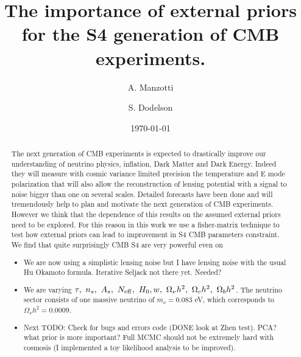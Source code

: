 \documentclass[aps,prl,preprint,groupedaddress]{revtex4-1}
\begin{document}
\graphicspath{{images/}}


\title{The importance of external priors for the S4 generation of CMB experiments.}

\author{A. Manzotti}
\author{S. Dodelson}


\date{\today}

\begin{abstract}
The next generation of CMB experiments is expected to drastically improve our understanding of neutrino physics, inflation, Dark Matter and Dark Energy.
Indeed they will measure with cosmic variance limited precision the temperature and E mode polarization that will also allow the reconstruction of lensing potential with a signal to noise bigger than one on several scales. Detailed forecasts have been done and will tremendously help to plan and motivate the next generation of CMB experiments. However we think that the dependence of this results on the assumed external priors need to be explored. For this reason in this work we use a fisher-matrix technique to test how external priors can lead to improvement in S4 CMB parameters constraint. We find that quite surprisingly CMB S4 are very powerful even on

\begin{itemize}
\item We are now using a simplistic lensing noise but I have lensing noise with the usual Hu Okamoto formula. Iterative Seljack not there yet. Needed?
\item We are varying $\tau, ~ n_{s}, ~ A_{s}, ~ N_{\rm eff}, ~ H_{0}, w,~\Omega_{\nu}h^{2},~\Omega_{c}h^{2},~\Omega_{b}h^{2}$. The neutrino sector consists of one massive neutrino of $m_{\nu}=0.083$ eV, which corresponds to $\Omega_{\nu}h^{2}=0.0009$.
\item Next TODO: Check for bugs and errors code (DONE look at Zhen test). PCA? what prior is more important? Full MCMC should not be extremely hard with cosmosis (I implemented a toy likelihood analysis to be improved).
\end{itemize}


\end{abstract}
\end{document}
